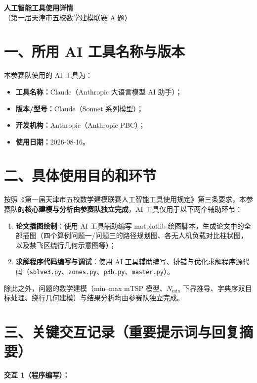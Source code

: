 \documentclass[12pt,a4paper]{ctexart}
\begin{document}
\begin{center}
  {\bfseries 人工智能工具使用详情}\\[4pt]
  {（第一届天津市五校数学建模联赛 A 题）}
\end{center}

\section*{一、所用 AI 工具名称与版本}

本参赛队使用的 AI 工具为：

\begin{itemize}
  \item \textbf{工具名称：}Claude（Anthropic 大语言模型 AI 助手）；
  \item \textbf{版本/型号：}Claude（Sonnet 系列模型）；
  \item \textbf{开发机构：}Anthropic（Anthropic PBC）；
  \item \textbf{使用日期：}2026-08-16。
\end{itemize}

\section*{二、具体使用目的和环节}

按照《第一届天津市五校数学建模联赛人工智能工具使用规定》第三条要求，本参赛队的\textbf{核心建模与分析由参赛队独立完成}，AI 工具仅用于以下两个辅助环节：

\begin{enumerate}
  \item \textbf{论文插图绘制}：使用 AI 工具辅助编写 matplotlib 绘图脚本，生成论文中的全部插图（四个算例问题一/问题三的路径规划图、各无人机负载对比柱状图，以及禁飞区绕行几何示意图等）；
  \item \textbf{求解程序代码编写与调试}：使用 AI 工具辅助编写、排错与优化求解程序源代码（\texttt{solve3.py}、\texttt{zones.py}、\texttt{p3b.py}、\texttt{master.py}）。
\end{enumerate}

除此之外，问题的数学建模（min--max mTSP 模型、$N_{\min}$ 下界推导、字典序双目标处理、绕行几何建模）与结果分析均由参赛队独立完成。

\section*{三、关键交互记录（重要提示词与回复摘要）}

\textbf{交互 1（程序编写）：}
\end{document}
